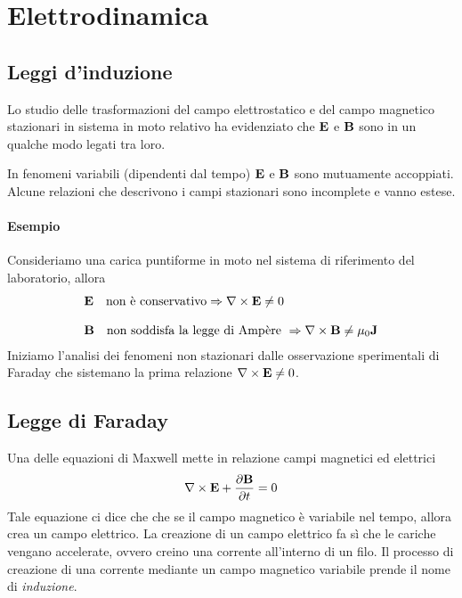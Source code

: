 \setcounter{chapter}{4}
\chapter{Elettrodinamica}

\section{Leggi d'induzione}

Lo studio delle trasformazioni del campo elettrostatico e del campo magnetico stazionari in sistema in moto relativo ha evidenziato che $\bold{E}$ e $\bold{B}$ sono in un qualche modo legati tra loro.

In fenomeni variabili (dipendenti dal tempo) $\bold{E}$ e $\bold{B}$ sono mutuamente accoppiati. Alcune relazioni che descrivono i campi stazionari sono incomplete e vanno estese.
\subsubsection{Esempio}

Consideriamo una carica puntiforme in moto nel sistema di riferimento del laboratorio, allora
\begin{align*}
	& \bold{E} \quad \text{non \`e conservativo} \Rightarrow \nabla \times \bold{E} \neq 0 \\[0.3cm]
	& \bold{B} \quad \text{non soddisfa la legge di Amp\`ere } \Rightarrow \nabla \times \bold{B} \neq \mu_0 \bold{J}
\end{align*}
Iniziamo l'analisi dei fenomeni non stazionari dalle osservazione sperimentali di Faraday che sistemano la prima relazione $\nabla \times \bold{E} \neq 0$.
\newpage

\section{Legge di Faraday}

Una delle equazioni di Maxwell mette in relazione campi magnetici ed elettrici 
\begin{equation}
	\nabla \times \bold{E} + \frac{\partial \bold{B}}{\partial t} = 0
\end{equation}
Tale equazione ci dice che che se il campo magnetico \`e variabile nel tempo, allora crea un campo elettrico. La creazione di un campo elettrico fa s\`i che le cariche vengano accelerate, ovvero creino una corrente all'interno di un filo. Il processo di creazione di una corrente mediante un campo magnetico variabile prende il nome di \textit{induzione}.

